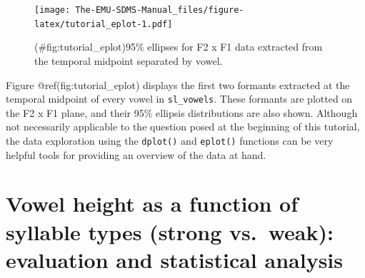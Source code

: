 \documentclass[]{book}
\newenvironment{Shaded}{\begin{snugshade}}{\end{snugshade}}
\newcommand{\KeywordTok}[1]{\textcolor[rgb]{0.13,0.29,0.53}{\textbf{{#1}}}}
\newcommand{\DataTypeTok}[1]{\textcolor[rgb]{0.13,0.29,0.53}{{#1}}}
\newcommand{\DecValTok}[1]{\textcolor[rgb]{0.00,0.00,0.81}{{#1}}}
\newcommand{\FloatTok}[1]{\textcolor[rgb]{0.00,0.00,0.81}{{#1}}}
\newcommand{\StringTok}[1]{\textcolor[rgb]{0.31,0.60,0.02}{{#1}}}
\newcommand{\CommentTok}[1]{\textcolor[rgb]{0.56,0.35,0.01}{\textit{{#1}}}}
\newcommand{\OtherTok}[1]{\textcolor[rgb]{0.56,0.35,0.01}{{#1}}}
\newcommand{\NormalTok}[1]{{#1}}
\theoremstyle{definition}
\theoremstyle{definition}
\theoremstyle{definition}
\theoremstyle{remark}
\begin{document}
\begin{Shaded}
\end{Shaded}

\begin{figure}
\centering
\texttt{[image: The-EMU-SDMS-Manual\_files/figure-latex/tutorial\_eplot-1.pdf]}
\caption{(\#fig:tutorial\_eplot)95\% ellipses for F2 x F1 data extracted
from the temporal midpoint separated by vowel.}
\end{figure}

Figure @ref(fig:tutorial\_eplot) displays the first two formants
extracted at the temporal midpoint of every vowel in
\texttt{sl\_vowels}. These formants are plotted on the F2 x F1 plane,
and their 95\% ellipsis distributions are also shown. Although not
necessarily applicable to the question posed at the beginning of this
tutorial, the data exploration using the \texttt{dplot()} and
\texttt{eplot()} functions can be very helpful tools for providing an
overview of the data at hand.

\section{Vowel height as a function of syllable types (strong vs.~weak):
evaluation and statistical
analysis}\label{vowel-height-as-a-function-of-syllable-types-strong-vs.weak-evaluation-and-statistical-analysis}
\end{document}
